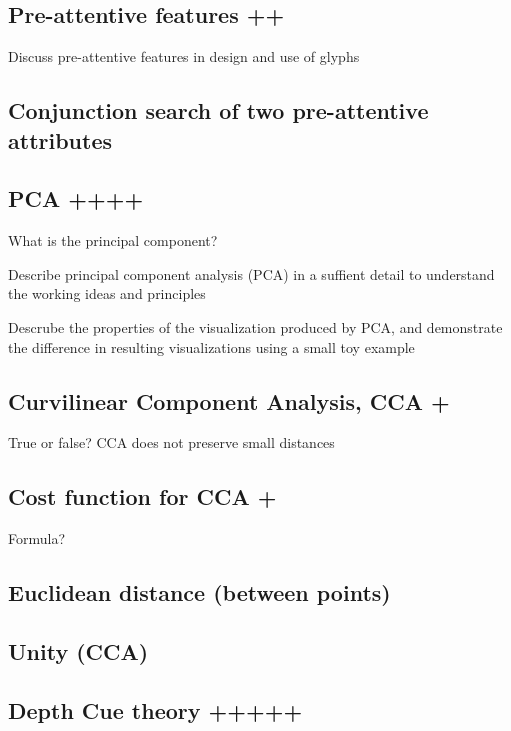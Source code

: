 \documentclass[a4paper]{article}
\begin{document}
\subsection{Pre-attentive features ++}



Discuss pre-attentive features in design and use of glyphs

\subsection{Conjunction search of two pre-attentive attributes}

\subsection{PCA ++++}

What is the principal component?



Describe principal component analysis (PCA) in a suffient detail to understand the working ideas and principles

Descrube the properties of the visualization produced by PCA, and demonstrate the difference in resulting visualizations using a small toy example

\subsection{Curvilinear Component Analysis, CCA +}

True or false? CCA does not preserve small distances

\subsection{Cost function for CCA +}

Formula?

\subsection{Euclidean distance (between points)}

\subsection{Unity (CCA)}

\subsection{Depth Cue theory +++++}
\end{document}

